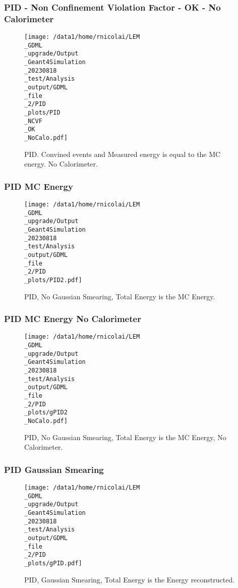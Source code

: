 \documentclass[8pt]{beamer}
\begin{document}
            \begin{frame}
                \frametitle{PID - Non Confinement Violation Factor - OK - No Calorimeter}
            
        \begin{figure}[h]
            \centering
            \texttt{[image: /data1/home/rnicolai/LEM\\\_GDML\\\_upgrade/Output\\\_Geant4Simulation\\\_20230818\\\_test/Analysis\\\_output/GDML\\\_file\\\_2/PID\\\_plots/PID\\\_NCVF\\\_OK\\\_NoCalo.pdf]}
            \caption{PID. Convined events and Measured energy is equal to the MC energy. No Calorimeter.}
        \end{figure}
        
            \end{frame}
            
            \begin{frame}
                \frametitle{PID MC Energy}
            
        \begin{figure}[h]
            \centering
            \texttt{[image: /data1/home/rnicolai/LEM\\\_GDML\\\_upgrade/Output\\\_Geant4Simulation\\\_20230818\\\_test/Analysis\\\_output/GDML\\\_file\\\_2/PID\\\_plots/PID2.pdf]}
            \caption{PID, No Gaussian Smearing, Total Energy is the MC Energy.}
        \end{figure}
        
            \end{frame}
            
            \begin{frame}
                \frametitle{PID MC Energy No Calorimeter}
            
        \begin{figure}[h]
            \centering
            \texttt{[image: /data1/home/rnicolai/LEM\\\_GDML\\\_upgrade/Output\\\_Geant4Simulation\\\_20230818\\\_test/Analysis\\\_output/GDML\\\_file\\\_2/PID\\\_plots/gPID2\\\_NoCalo.pdf]}
            \caption{PID, No Gaussian Smearing, Total Energy is the MC Energy, No Calorimeter.}
        \end{figure}
        
            \end{frame}
            
            \begin{frame}
                \frametitle{PID Gaussian Smearing}
            
        \begin{figure}[h]
            \centering
            \texttt{[image: /data1/home/rnicolai/LEM\\\_GDML\\\_upgrade/Output\\\_Geant4Simulation\\\_20230818\\\_test/Analysis\\\_output/GDML\\\_file\\\_2/PID\\\_plots/gPID.pdf]}
            \caption{PID, Gaussian Smearing, Total Energy is the Energy reconstructed.}
        \end{figure}
        
            \end{frame}
            
\end{document}
